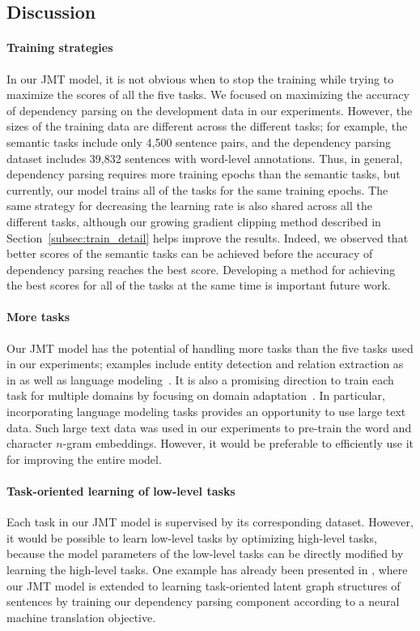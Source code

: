 \documentclass[11pt,a4paper]{article}
\begin{document}
\subsection{Discussion}

\paragraph{Training strategies}
In our JMT model, it is not obvious when to stop the training while trying to maximize the scores of all the five tasks.
We focused on maximizing the accuracy of dependency parsing on the development data in our experiments.
However, the sizes of the training data are different across the different tasks; for example, the semantic tasks include only 4,500 sentence pairs, and the dependency parsing dataset includes 39,832 sentences with word-level annotations.
Thus, in general, dependency parsing requires more training epochs than the semantic tasks, but currently, our model trains all of the tasks for the same training epochs.
The same strategy for decreasing the learning rate is also shared across all the different tasks, although our growing gradient clipping method described in Section~\ref{subsec:train_detail} helps improve the results.
Indeed, we observed that better scores of the semantic tasks can be achieved before the accuracy of dependency parsing reaches the best score.
Developing a method for achieving the best scores for all of the tasks at the same time is important future work.

\paragraph{More tasks}
Our JMT model has the potential of handling more tasks than the five tasks used in our experiments; examples include entity detection and relation extraction as in \citet{miwa2016rel} as well as language modeling~\citep{godwin2016multi}.
It is also a promising direction to train each task for multiple domains by focusing on domain adaptation~\citep{sogaard2016}.
In particular, incorporating language modeling tasks provides an opportunity to use large text data.
Such large text data was used in our experiments to pre-train the word and character $n$-gram embeddings. However, it would be preferable to efficiently use it for improving the entire model.

\paragraph{Task-oriented learning of low-level tasks}
Each task in our JMT model is supervised by its corresponding dataset.
However, it would be possible to learn low-level tasks by optimizing high-level tasks, because the model parameters of the low-level tasks can be directly modified by learning the high-level tasks.
One example has already been presented in \citet{hashimoto2017lgp}, where our JMT model is extended to learning task-oriented latent graph structures of sentences by training our dependency parsing component according to a neural machine translation objective.
\end{document}
